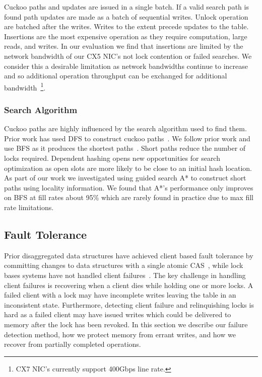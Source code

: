 Cuckoo paths and updates are issued in a single batch. If a
valid search path is found path updates are made as a batch
of sequential writes. Unlock operation are batched after the
writes. Writes to the extent precede updates to the table.
Insertions are the most expensive operation as they require
computation, large reads, and writes. In our evaluation we
find that insertions are limited by the network bandwidth of
our CX5 NIC's not lock contention or failed searches. We
consider this a desirable limitation as network bandwidths
continue to increase and so additional operation throughput
can be exchanged for additional bandwidth~\footnote{CX7
NIC's currently support 400Gbps line rate.}.


\subsubsection{Search Algorithm} 

Cuckoo paths are highly influenced by the search algorithm 
used to find them. Prior work has used DFS to construct 
cuckoo paths~\cite{pilaf,memc3}. We follow prior work and 
use BFS as it produces the shortest 
paths~\cite{cuckoo-improvements}. Short paths reduce the 
number of locks required. Dependent hashing opens new 
opportunities for search optimization as open slots are more
likely to be close to an initial hash location. As part of
our work we investigated using guided search A* to construct
short paths using locality information. We found that A*'s
performance only improves on BFS at fill rates about 95\%
which are rarely found in practice due to max fill rate
limitations.

\subsection{Fault Tolerance}
\label{sec:fault-tolerance}

Prior disaggregated data structures have achieved client
based fault tolerance by committing changes to data
structures with a single atomic CAS~\cite{clover,race},
while lock bases systems have not handled client
failures~\cite{sherman}. The key challenge in handling
client failures is recovering when a client dies while
holding one or more locks. A failed client with a lock may
have incomplete writes leaving the table in an inconsistent
state. Furthermore, detecting client failure and
relinquishing locks is hard as a failed client may have
issued writes which could be delivered to memory after the
lock has been revoked. In this section we describe our
failure detection method, how we protect memory from errant
writes, and how we recover from partially completed operations.

